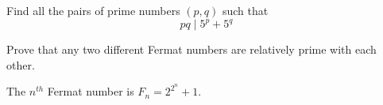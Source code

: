\documentclass{subfile}
\begin{document}
	\begin{problem}[China 2009]
		Find all the pairs of prime numbers $ (p,q)$ such that $$ pq \mid 5^p+5^q$$ %
	\end{problem}


	\begin{problem}
		Prove that any two different Fermat numbers are relatively prime with each other.
	\end{problem}

	\begin{note}
		The $n^{th}$ Fermat number is $F_n = 2^{2^n} + 1$.
	\end{note}

\end{document}
